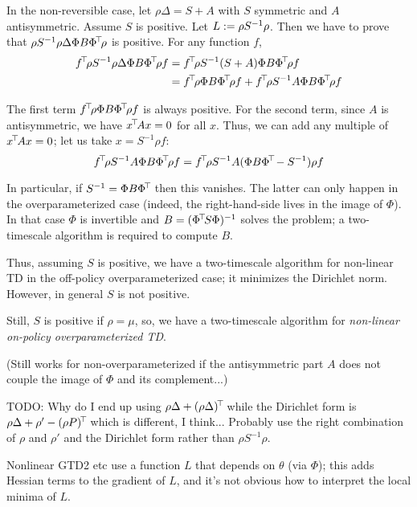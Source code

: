 \documentclass[11pt,a4paper]{article}
\begin{document}
In the non-reversible case, let $\rho\Delta=S+A$ with $S$ symmetric and
$A$ antisymmetric. Assume $S$ is positive. Let $L\mathrel{\mathop{:}}= \rho S^{-1} \rho$. Then we have to prove that
$\rho S^{-1} \rho \Delta \Phi B\Phi^{\!\top}\!\rho$ is positive. For any
function $f$,
\begin{align}
\transp{f} \rho S^{-1} \rho \Delta \Phi B\transp{\Phi}\rho f
&=\transp{f} \rho S^{-1} (S+A) \Phi B\transp{\Phi}\rho f
\\&=\transp{f} \rho \Phi B\transp{\Phi}\rho f + \transp{f} \rho S^{-1}
A \Phi B\transp{\Phi}\rho f
\end{align}

The first term $f^{\!\top}\!
\rho \Phi B\Phi^{\!\top}\!\rho f$ is always positive. For the second
term, since $A$ is antisymmetric, we have $x^{\!\top}\!Ax=0$ for all $x$.
Thus, we can add any multiple of $x^{\!\top}\!Ax=0$; let us take
$x=S^{-1}\rho f$:
\begin{equation}
\transp{f} \rho S^{-1}
A \Phi B\transp{\Phi}\rho f=
\transp{f} \rho S^{-1}A (\Phi B\transp{\Phi}-S^{-1})\rho f
\end{equation}

In particular, if $S^{-1}=\Phi B\Phi^{\!\top}\!$ then this vanishes.
The latter can only happen in the overparameterized case (indeed, the
right-hand-side lives in the image of $\Phi$). In that case $\Phi$ is
invertible and $B=(\Phi^{\!\top}\!S\Phi)^{-1}$ solves the problem; a
two-timescale algorithm is required to compute $B$.

Thus, assuming $S$ is positive, we have a two-timescale algorithm for non-linear TD in the off-policy
overparameterized case; it minimizes the Dirichlet norm.
However, in general $S$ is not positive.

Still, $S$ is positive if $\rho=\mu$, so,
we have a two-timescale algorithm for \emph{non-linear on-policy
overparameterized TD}.

(Still works for non-overparameterized if the antisymmetric part $A$ does not couple the image
of $\Phi$ and its complement...)

TODO: Why do I end up using $\rho\Delta+(\rho \Delta)^{\!\top}\!$ while the
Dirichlet form is $\rho \Delta + \rho'-(\rho P)^{\!\top}\!$ which is
different, I think...  Probably use the right combination of $\rho$ and
$\rho'$ and the Dirichlet form rather than $\rho S^{-1}\rho$.

Nonlinear GTD2 etc use a function $L$ that depends on $\theta$ (via
$\Phi$); this adds Hessian terms to the gradient of $L$, and it's not
obvious how to interpret the local minima of $L$.
\end{document}
